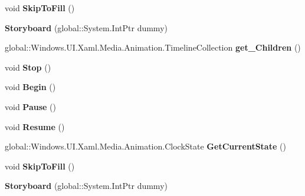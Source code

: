 \begin{DoxyCompactItemize}
void {\bfseries Skip\+To\+Fill} ()
\item 
\mbox{\label{class_windows_1_1_u_i_1_1_xaml_1_1_media_1_1_animation_1_1_storyboard_ac3faa5cda538d41cc59013f3f81f1655}} 
{\bfseries Storyboard} (global\+::\+System.\+Int\+Ptr dummy)
\item 
\mbox{\label{class_windows_1_1_u_i_1_1_xaml_1_1_media_1_1_animation_1_1_storyboard_ad0f6b9c0bedc7d1b44d1977fc371c08c}} 
global\+::\+Windows.\+U\+I.\+Xaml.\+Media.\+Animation.\+Timeline\+Collection {\bfseries get\+\_\+\+Children} ()
\item 
\mbox{\label{class_windows_1_1_u_i_1_1_xaml_1_1_media_1_1_animation_1_1_storyboard_aa40e1168c9cf5d0a608c601e86efc278}} 
void {\bfseries Stop} ()
\item 
\mbox{\label{class_windows_1_1_u_i_1_1_xaml_1_1_media_1_1_animation_1_1_storyboard_aebd7156a0b7f433f785472aa73411daa}} 
void {\bfseries Begin} ()
\item 
\mbox{\label{class_windows_1_1_u_i_1_1_xaml_1_1_media_1_1_animation_1_1_storyboard_ae4c08b52d0438fb4e059923d544e8af6}} 
void {\bfseries Pause} ()
\item 
\mbox{\label{class_windows_1_1_u_i_1_1_xaml_1_1_media_1_1_animation_1_1_storyboard_ad18fec80569ba300486c385391f2fc96}} 
void {\bfseries Resume} ()
\item 
\mbox{\label{class_windows_1_1_u_i_1_1_xaml_1_1_media_1_1_animation_1_1_storyboard_a633685fb262335d00b50b36515373160}} 
global\+::\+Windows.\+U\+I.\+Xaml.\+Media.\+Animation.\+Clock\+State {\bfseries Get\+Current\+State} ()
\item 
\mbox{\label{class_windows_1_1_u_i_1_1_xaml_1_1_media_1_1_animation_1_1_storyboard_ac88c93db5e691dd229f0f19a90e80af6}} 
void {\bfseries Skip\+To\+Fill} ()
\item 
\mbox{\label{class_windows_1_1_u_i_1_1_xaml_1_1_media_1_1_animation_1_1_storyboard_ac3faa5cda538d41cc59013f3f81f1655}} 
{\bfseries Storyboard} (global\+::\+System.\+Int\+Ptr dummy)
\end{DoxyCompactItemize}
